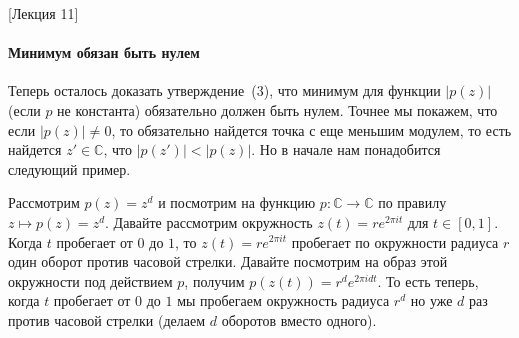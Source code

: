 [Лекция 11]


\paragraph{Минимум обязан быть нулем}

Теперь осталось доказать утверждение~(3), что минимум для функции $|p(z)|$ (если $p$ не константа) обязательно должен быть нулем.
Точнее мы покажем, что если $|p(z)|\neq 0$, то обязательно найдется точка с еще меньшим модулем, то есть найдется $z'\in \mathbb C$, что $|p(z')|< |p(z)|$.
Но в начале нам понадобится следующий пример.

\begin{example}
[V.I.P. пример]
Рассмотрим $p(z) = z^d$ и посмотрим на функцию $p\colon \mathbb C\to \mathbb C$ по правилу $z \mapsto p(z) = z^d$.
Давайте рассмотрим окружность $z(t) = r e^{2\pi i t}$ для $t\in [0, 1]$.
Когда $t$ пробегает от $0$ до $1$, то $z(t) = r e^{2\pi i t}$ пробегает по окружности радиуса $r$ один оборот против часовой стрелки.
Давайте посмотрим на образ этой окружности под действием $p$, получим $p(z(t)) = r^d e^{2\pi i d t}$.
То есть теперь, когда $t$ пробегает от $0$ до $1$ мы пробегаем окружность радиуса $r^d$ но уже $d$ раз против часовой стрелки (делаем $d$ оборотов вместо одного).
\end{example}


